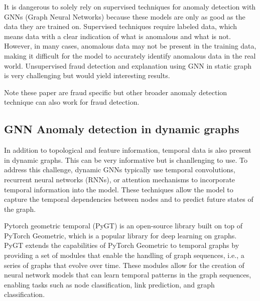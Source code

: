 It is dangerous to solely rely on supervised techniques for anomaly detection with GNNs (Graph Neural Networks) because these models are only as good as the data they are trained on. Supervised techniques require labeled data, which means data with a clear indication of what is anomalous and what is not. However, in many cases, anomalous data may not be present in the training data, making it difficult for the model to accurately identify anomalous data in the real world. Unsupervised fraud detection and explanation using GNN in static graph is very challenging but would yield interesting results.

Note these paper are fraud specific but other broader anomaly detection technique can also work for fraud detection.

\subsection{GNN Anomaly detection in dynamic graphs}

In addition to topological and feature information, temporal data is also present in dynamic graphs. This can be very informative but is chanllenging to use. To address this challenge, dynamic GNNs typically use temporal convolutions, recurrent neural networks (RNNs), or attention mechanisms to incorporate temporal information into the model. These techniques allow the model to capture the temporal dependencies between nodes and to predict future states of the graph.

Pytorch geometric temporal (PyGT) \cite{rozemberczki_pytorch_2021} is an open-source library built on top of PyTorch Geometric, which is a popular library for deep learning on graphs. PyGT extends the capabilities of PyTorch Geometric to temporal graphs by providing a set of modules that enable the handling of graph sequences, i.e., a series of graphs that evolve over time. These modules allow for the creation of neural network models that can learn temporal patterns in the graph sequences, enabling tasks such as node classification, link prediction, and graph classification.


